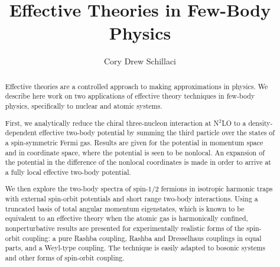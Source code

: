 \documentclass{ucbthesis}
\begin{document}

\title{Effective Theories in Few-Body Physics}
\author{Cory Drew Schillaci}


\maketitle
\copyrightpage

\begin{abstract}

Effective theories are a controlled approach to making approximations in physics. We describe here work on two applications of effective theory techniques in few-body physics, specifically to nuclear and atomic systems.

First, we analytically reduce the chiral three-nucleon interaction at N$^2$LO to a density-dependent effective two-body potential by summing the third particle over the states of a spin-symmetric Fermi gas. Results are given for the potential in momentum space and in coordinate space, where the potential is seen to be nonlocal. An expansion of the potential in the difference of the nonlocal coordinates is made in order to arrive at a fully local effective two-body potential. 

We then explore the two-body spectra of spin-$1/2$ fermions in isotropic harmonic traps with external spin-orbit potentials and short range two-body interactions. Using a truncated basis of total angular momentum eigenstates, which is known to be equivalent to an effective theory when the atomic gas is harmonically confined, nonperturbative results are presented for experimentally realistic forms of the spin-orbit coupling: a pure Rashba coupling, Rashba and Dresselhaus couplings in equal parts, and a Weyl-type coupling. The technique is easily adapted to bosonic systems and other forms of spin-orbit coupling.
\end{abstract}
\end{document}
